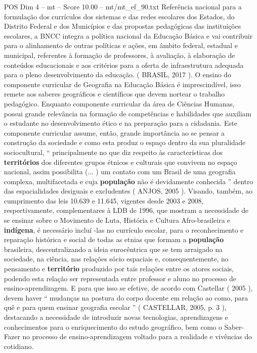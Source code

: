 \begin{textsample}{POS Dim 4 – mt – Score 10.00 – mt/mt\_ef\_90.txt}
Referência nacional para a formulação dos currículos dos sistemas e das redes escolares dos Estados, do Distrito Federal e dos Municípios e das propostas pedagógicas das instituições escolares, a BNCC integra a política nacional da Educação Básica e vai contribuir para o alinhamento de outras políticas e ações, em âmbito federal, estadual e municipal, referentes à formação de professores, à avaliação, à elaboração de conteúdos educacionais e aos critérios para a oferta de infraestrutura adequada para o pleno desenvolvimento da educação. ( BRASIL, 2017 ).
O ensino do componente curricular de Geografia na Educação Básica é imprescindível, isso remete aos saberes geográficos e científicos que devem nortear o trabalho pedagógico.
Enquanto componente curricular da área de Ciências Humanas, possui grande relevância na formação de competências e habilidades que auxiliam o estudante no desenvolvimento ético e na preparação para a cidadania.
Este componente curricular assume, então, grande importância ao se pensar a construção da sociedade e como esta produz o espaço dentro da sua pluralidade sociocultural, “ principalmente no que diz respeito às características dos \textbf{territórios} dos diferentes grupos étnicos e culturais que convivem no espaço nacional, assim possibilita (... ) um contato com um Brasil de uma geografia complexa, multifacetada e cuja \textbf{população} não é devidamente conhecida ” dentro das espacialidades desiguais e excludentes ( ANJOS, 2005 ).
Visando, também, ao cumprimento das leis 10.639 e 11.645, vigentes desde 2003 e 2008, respectivamente, complementares à LDB de 1996, que mostram a necessidade de se ensinar sobre o Movimento de Luta, História e Cultura Afro-brasileira e \textbf{indígena}, é necessário incluí -las no currículo escolar, para o reconhecimento e reparação histórica e social de todas as etnias que formam a \textbf{população} brasileira, descentralizando a ideia eurocêntrica que se tem arraigado na sociedade, na ciência, nas relações sócio espaciais e, consequentemente, no pensamento e \textbf{território} produzido por tais relações entre os atores sociais, podendo esta relação ser representada entre professor e aluno no processo de ensino-aprendizagem.
E para que isso se efetive, de acordo com Castellar ( 2005 ), devem haver “ mudanças na postura do corpo docente em relação ao como, para quê e para quem ensinar geografia escolar ” ( CASTELLAR, 2005, p. 3 ), destacando a necessidade de introduzir novas tecnologias, aprendizagens e conhecimentos para o enriquecimento do estudo geográfico, bem como o Saber-Fazer no processo de ensino-aprendizagem voltado para a realidade e vivências do cotidiano.

\end{textsample}
